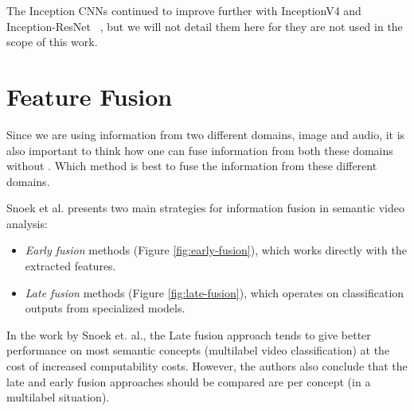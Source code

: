 The Inception CNNs continued to improve further with InceptionV4 and Inception-ResNet ~\cite{szegedy2017inceptionv4}, but we will not detail them here for they are not used in the scope of this work.



\section{Feature Fusion}
\label{sec:feature_fusion}

Since we are using information from two different domains, image and audio, it is also important to think how one can fuse information from both these domains without . 
Which method is best to fuse the information from these different domains.

Snoek et al. \cite{snoek2005featurefusion} presents two main strategies for information fusion in semantic video analysis: 
\begin{itemize}
    \item \emph{Early fusion} methods (Figure \ref{fig:early-fusion}), which works directly with the extracted features.
    \item \emph{Late fusion} methods (Figure \ref{fig:late-fusion}), which operates on classification outputs from specialized models.
\end{itemize}

In the work by Snoek et. al.\cite{snoek2005featurefusion}, the Late fusion approach tends to give better performance on most semantic concepts (multilabel video classification) at the cost of increased computability costs. However, the authors also conclude that the late and early fusion approaches should be compared are per concept (in a multilabel situation).%

